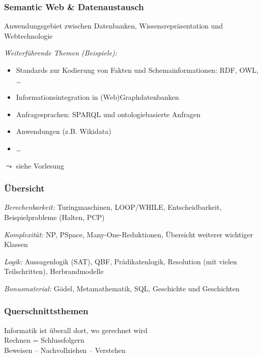 \documentclass[onlymath]{beamer}
\begin{document}
\begin{frame}\frametitle{Semantic Web \& Datenaustausch}

Anwendungsgebiet zwischen Datenbanken, Wissensrepräsentation und Webtechnologie
\bigskip

\emph{Weiterführende Themen (Beispiele):}
\begin{itemize}
\item Standards zur Kodierung von Fakten und Schemainformationen: RDF, OWL, \ldots
\item Informationsintegration in (Web)Graphdatenbanken
\item Anfragesprachen: SPARQL und ontologiebasierte Anfragen
\item Anwendungen (z.B. Wikidata)
\item \ldots
\end{itemize}

$\leadsto$ siehe Vorlesung 

\end{frame}


\begin{frame}\frametitle{Übersicht}


\emph{Berechenbarkeit:} Turingmaschinen, LOOP/WHILE, Entscheidbarkeit, Beispielprobleme (Halten, PCP)
\bigskip

\emph{Komplexität:} NP, PSpace, Many-One-Reduktionen, Übersicht weiterer wichtiger Klassen
\bigskip

\emph{Logik:} Aussagenlogik (SAT), QBF, Prädikatenlogik, Resolution (mit vielen Teilschritten), Herbrandmodelle
\bigskip

\emph{Bonusmaterial:} Gödel, Metamathematik, SQL, Geschichte und Geschichten

\end{frame}

\begin{frame}\frametitle{Querschnittsthemen}

\begin{center}
\large

Informatik ist überall dort, wo gerechnet wird\pause\\[4ex]

Rechnen = Schlussfolgern\pause\\[4ex]

Beweisen -- Nachvollziehen -- Verstehen\pause\\[4ex]

\end{center}

\end{frame}
\end{document}
